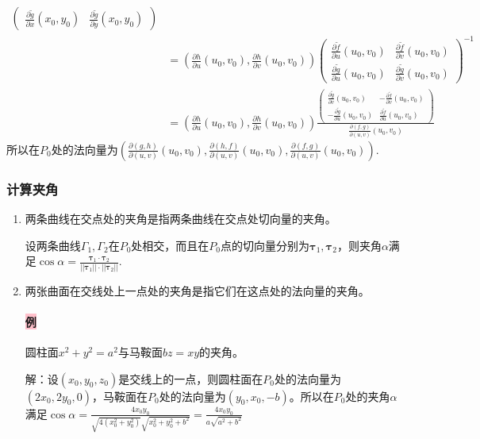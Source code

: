 \documentclass[UTF8]{ctexart}
\newcommand{\p}[2]{\frac{\partial #1}{\partial #2}}
\begin{document}
\begin{enumerate}[(1)]
\begin{align*}
\begin{pmatrix}
                \p{\tilde{g}}{x}(x_0,y_0)&\p{\tilde{g}}{y}(x_0,y_0)
            \end{pmatrix}\\
            &=\left(\p{h}{u}(u_0,v_0),\p{h}{v}(u_0,v_0)\right)\begin{pmatrix}
                \p{\tilde{f}}{u}(u_0,v_0)& \p{\tilde{f}}{v}(u_0,v_0)\\
                \p{\tilde{g}}{u}(u_0,v_0)& \p{\tilde{g}}{v}(u_0,v_0)
            \end{pmatrix}^{-1}\\
            &=\left(\p{h}{u}(u_0,v_0),\p{h}{v}(u_0,v_0)\right)\frac{\begin{pmatrix}
                \p{\tilde{g}}{v}(u_0,v_0)&-\p{\tilde{f}}{v}(u_0,v_0)\\
                -\p{\tilde{g}}{u}(u_0,v_0)&\p{\tilde{f}}{u}(u_0,v_0)
            \end{pmatrix}}{\p{(f,g)}{(u,v)}(u_0,v_0)}
        \end{align*}
        所以在$P_0$处的法向量为$\left(\p{(g,h)}{(u,v)}(u_0,v_0),\p{(h,f)}{(u,v)}(u_0,v_0),\p{(f,g)}{(u,v)}(u_0,v_0)\right)$.






        \subsubsection{计算夹角}
        \begin{enumerate}[(1)]
            \item 两条曲线在交点处的夹角是指两条曲线在交点处切向量的夹角。
            
            设两条曲线$\Gamma_1,\Gamma_2$在$P_0$处相交，而且在$P_0$点的切向量分别为$\boldsymbol{\tau}_1,\boldsymbol{\tau}_2$，则夹角$\alpha$满足$\cos\alpha=\frac{\boldsymbol{\tau}_1\cdot\boldsymbol{\tau}_2}{||\boldsymbol{\tau}_1||\cdot||\boldsymbol{\tau}_2||}$.
            \item 两张曲面在交线处上一点处的夹角是指它们在这点处的法向量的夹角。
            
            \paragraph{\colorbox{pink}{例}}圆柱面$x^2+y^2=a^2$与马鞍面$bz=xy$的夹角。

            解：设$(x_0,y_0,z_0)$是交线上的一点，则圆柱面在$P_0$处的法向量为$(2x_0,2y_0,0)$，马鞍面在$P_0$处的法向量为$(y_0,x_0,-b)$。所以在$P_0$处的夹角$\alpha$满足$\cos\alpha=\frac{4x_0y_0}{\sqrt{4(x_0^2+y_0^2)}\sqrt{x_0^2+y_0^2+b^2}}=\frac{4x_0y_0}{a\sqrt{a^2+b^2}}$
        \end{enumerate}
    \end{enumerate}
\end{document}
